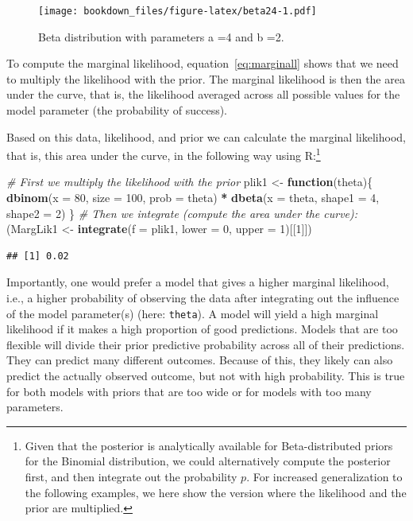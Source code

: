 \documentclass[12pt,]{krantz}
\newenvironment{Shaded}{\begin{snugshade}}{\end{snugshade}}
\newcommand{\CommentTok}[1]{\textcolor[rgb]{0.56,0.35,0.01}{\textit{#1}}}
\newcommand{\ControlFlowTok}[1]{\textcolor[rgb]{0.13,0.29,0.53}{\textbf{#1}}}
\newcommand{\DataTypeTok}[1]{\textcolor[rgb]{0.13,0.29,0.53}{#1}}
\newcommand{\DecValTok}[1]{\textcolor[rgb]{0.00,0.00,0.81}{#1}}
\newcommand{\KeywordTok}[1]{\textcolor[rgb]{0.13,0.29,0.53}{\textbf{#1}}}
\newcommand{\NormalTok}[1]{#1}
\newcommand{\OperatorTok}[1]{\textcolor[rgb]{0.81,0.36,0.00}{\textbf{#1}}}
\newcommand{\StringTok}[1]{\textcolor[rgb]{0.31,0.60,0.02}{#1}}
\theoremstyle{definition}
\theoremstyle{definition}
\theoremstyle{definition}
\theoremstyle{remark}
\begin{document}
\begin{figure}
\centering
\texttt{[image: bookdown\_files/figure-latex/beta24-1.pdf]}
\caption{\label{fig:beta24}Beta distribution with parameters a =4 and b =2.}
\end{figure}

To compute the marginal likelihood, equation~\eqref{eq:marginall} shows that we need to multiply the likelihood with the prior. The marginal likelihood is then the area under the curve, that is, the likelihood averaged across all possible values for the model parameter (the probability of success).

Based on this data, likelihood, and prior we can calculate the marginal likelihood, that is, this area under the curve, in the following way using R:\footnote{Given that the posterior is analytically available for Beta-distributed priors for the Binomial distribution, we could alternatively compute the posterior first, and then integrate out the probability \(p\). For increased generalization to the following examples, we here show the version where the likelihood and the prior are multiplied.}

\begin{Shaded}
\begin{Highlighting}[]
\CommentTok{# First we multiply the likelihood with the prior}
\NormalTok{plik1 <-}\StringTok{ }\ControlFlowTok{function}\NormalTok{(theta)\{}
  \KeywordTok{dbinom}\NormalTok{(}\DataTypeTok{x =} \DecValTok{80}\NormalTok{, }\DataTypeTok{size =} \DecValTok{100}\NormalTok{, }\DataTypeTok{prob =}\NormalTok{ theta) }\OperatorTok{*}
\StringTok{    }\KeywordTok{dbeta}\NormalTok{(}\DataTypeTok{x =}\NormalTok{ theta, }\DataTypeTok{shape1 =} \DecValTok{4}\NormalTok{, }\DataTypeTok{shape2 =} \DecValTok{2}\NormalTok{)}
\NormalTok{  \}}
\CommentTok{# Then we integrate (compute the area under the curve):}
\NormalTok{(MargLik1 <-}\StringTok{ }\KeywordTok{integrate}\NormalTok{(}\DataTypeTok{f =}\NormalTok{ plik1, }\DataTypeTok{lower =} \DecValTok{0}\NormalTok{, }\DataTypeTok{upper =} \DecValTok{1}\NormalTok{)[[}\DecValTok{1}\NormalTok{]])}
\end{Highlighting}
\end{Shaded}

\begin{verbatim}
## [1] 0.02
\end{verbatim}

Importantly, one would prefer a model that gives a higher marginal likelihood, i.e., a higher probability of observing the data after integrating out the influence of the model parameter(s) (here: \texttt{theta}). A model will yield a high marginal likelihood if it makes a high proportion of good predictions. Models that are too flexible will divide their prior predictive probability across all of their predictions. They can predict many different outcomes. Because of this, they likely can also predict the actually observed outcome, but not with high probability. This is true for both models with priors that are too wide or for models with too many parameters.
\end{document}
